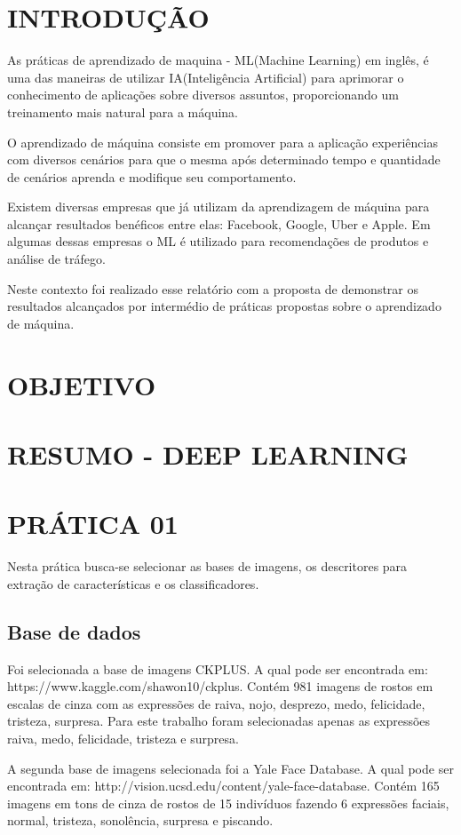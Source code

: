 \documentclass[a4paper, 12 pt, conference]{ieeeconf}  %
\begin{document}
\section{INTRODUÇÃO}
As práticas de aprendizado de maquina - ML(Machine Learning) em inglês, é uma das maneiras de utilizar IA(Inteligência Artificial) para aprimorar o conhecimento de aplicações sobre diversos assuntos, proporcionando um treinamento mais natural para a máquina.

O aprendizado de máquina consiste em promover para a aplicação experiências com diversos cenários para que o mesma após determinado tempo e quantidade de cenários aprenda e modifique seu comportamento.

Existem diversas empresas que já utilizam da aprendizagem de máquina para alcançar resultados benéficos entre elas: Facebook, Google, Uber e Apple. Em algumas dessas empresas o ML é utilizado para recomendações de produtos e análise de tráfego.

Neste contexto foi realizado esse relatório com a proposta de demonstrar os resultados alcançados por intermédio de práticas propostas sobre o aprendizado de máquina.
\section{OBJETIVO}
\section{RESUMO - DEEP LEARNING}
\section{PRÁTICA 01}
\label{pratica01}
Nesta prática busca-se selecionar as bases de imagens, os descritores para extração de características e os classificadores.

\subsection{Base de dados}
Foi selecionada a base de imagens CKPLUS. A qual pode ser encontrada em: https://www.kaggle.com/shawon10/ckplus. Contém 981 imagens de rostos em escalas de cinza com as expressões de raiva, nojo, desprezo, medo, felicidade, tristeza, surpresa. Para este trabalho foram selecionadas apenas as expressões raiva, medo, felicidade, tristeza e surpresa.

A segunda base de imagens selecionada foi a Yale Face Database. A qual pode ser encontrada em: http://vision.ucsd.edu/content/yale-face-database. Contém 165 imagens em tons de cinza de rostos de 15 indivíduos fazendo 6 expressões faciais, normal, tristeza, sonolência, surpresa e piscando.
\end{document}
